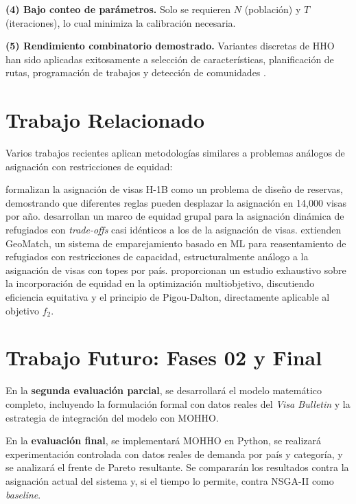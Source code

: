 \documentclass[12pt,letterpaper]{article}
\begin{document}
\textbf{(4) Bajo conteo de parámetros.} Solo se requieren $N$ (población) y $T$ (iteraciones), lo cual minimiza la calibración necesaria.

\textbf{(5) Rendimiento combinatorio demostrado.} Variantes discretas de HHO han sido aplicadas exitosamente a selección de características, planificación de rutas, programación de trabajos y detección de comunidades \parencite{alabool2021, zhang2023}.

\section{Trabajo Relacionado}

Varios trabajos recientes aplican metodologías similares a problemas análogos de asignación con restricciones de equidad:

\textcite{pathak2025} formalizan la asignación de visas H-1B como un problema de diseño de reservas, demostrando que diferentes reglas pueden desplazar la asignación en 14,000 visas por año. \textcite{freund2023} desarrollan un marco de equidad grupal para la asignación dinámica de refugiados con \textit{trade-offs} casi idénticos a los de la asignación de visas. \textcite{bansak2024} extienden GeoMatch, un sistema de emparejamiento basado en ML para reasentamiento de refugiados con restricciones de capacidad, estructuralmente análogo a la asignación de visas con topes por país. \textcite{li2024fairness} proporcionan un estudio exhaustivo sobre la incorporación de equidad en la optimización multiobjetivo, discutiendo eficiencia equitativa y el principio de Pigou-Dalton, directamente aplicable al objetivo $f_2$.

\section{Trabajo Futuro: Fases 02 y Final}

En la \textbf{segunda evaluación parcial}, se desarrollará el modelo matemático completo, incluyendo la formulación formal con datos reales del \textit{Visa Bulletin} y la estrategia de integración del modelo con MOHHO.

En la \textbf{evaluación final}, se implementará MOHHO en Python, se realizará experimentación controlada con datos reales de demanda por país y categoría, y se analizará el frente de Pareto resultante. Se compararán los resultados contra la asignación actual del sistema y, si el tiempo lo permite, contra NSGA-II como \textit{baseline}.
\end{document}
